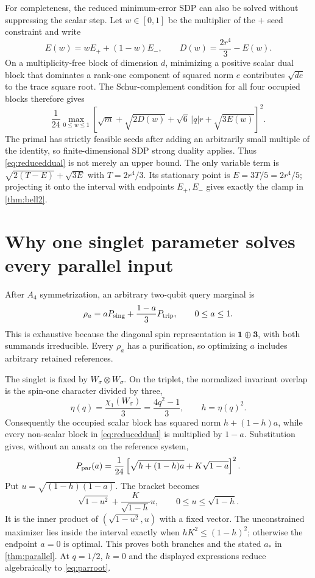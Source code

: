 \documentclass[11pt]{article}
\theoremstyle{definition}
\begin{document}
For completeness, the reduced minimum-error SDP can also be solved without
suppressing the scalar step.  Let $w\in[0,1]$ be the multiplier of the $+$
seed constraint and write
\[
 E(w)=wE_++(1-w)E_-,\qquad
 D(w)=\frac{2r^4}{3}-E(w).
\]
On a multiplicity-free block of dimension $d$, minimizing a positive scalar
dual block that dominates a rank-one component of squared norm $e$ contributes
$\sqrt{de}$ to the trace square root.  The Schur-complement condition for all
four occupied blocks therefore gives
\begin{equation}\label{eq:reduceddual}
 \frac1{24}\max_{0\le w\le1}
 \left[\sqrt m+\sqrt{2D(w)}+\sqrt6\,|q|r
       +\sqrt{3E(w)}\right]^2.
\end{equation}
The primal has strictly feasible seeds after adding an arbitrarily small
multiple of the identity, so finite-dimensional SDP strong duality applies.
Thus \cref{eq:reduceddual} is not merely an upper bound.  The only variable
term is $\sqrt{2(T-E)}+\sqrt{3E}$ with $T=2r^4/3$.  Its stationary point is
$E=3T/5=2r^4/5$; projecting it onto the interval with endpoints $E_+,E_-$
gives exactly the clamp in \cref{thm:bell2}.

\section{Why one singlet parameter solves every parallel input}\label{app:parallel}

After $A_4$ symmetrization, an arbitrary two-qubit query marginal is
\[
 \rho_a=aP_{\rm sing}+\frac{1-a}{3}P_{\rm trip},\qquad0\le a\le1.
\]
This is exhaustive because the diagonal spin representation is
$\mathbf1\oplus\mathbf3$, with both summands irreducible.  Every $\rho_a$ has
a purification, so optimizing $a$ includes arbitrary retained references.

The singlet is fixed by $W_\sigma\otimes W_\sigma$.  On the triplet, the
normalized invariant overlap is the spin-one character divided by three,
\[
 \eta(q)=\frac{\chi_1(W_\sigma)}3=\frac{4q^2-1}{3},
 \qquad h=\eta(q)^2.
\]
Consequently the occupied scalar block has squared norm
$h+(1-h)a$, while every non-scalar block in \cref{eq:reduceddual} is multiplied
by $1-a$.  Substitution gives, without an ansatz on the reference system,
\[
 P_{\rm par}(a)=\frac1{24}
 \left[\sqrt{h+(1-h)a}+K\sqrt{1-a}\right]^2.
\]
Put $u=\sqrt{(1-h)(1-a)}$.  The bracket becomes
\[
 \sqrt{1-u^2}+\frac{K}{\sqrt{1-h}}u,
 \qquad0\le u\le\sqrt{1-h}.
\]
It is the inner product of $(\sqrt{1-u^2},u)$ with a fixed vector.  The
unconstrained maximizer lies inside the interval exactly when
$hK^2\le(1-h)^2$; otherwise the endpoint $a=0$ is optimal.  This proves both
branches and the stated $a_*$ in \cref{thm:parallel}.  At $q=1/2$, $h=0$ and
the displayed expressions reduce algebraically to \cref{eq:parroot}.
\end{document}
